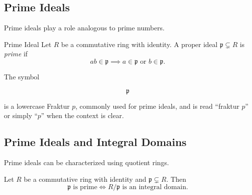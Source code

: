 \subsection{Prime Ideals}
\label{subsec:prime-ideals}

Prime ideals play a role analogous to prime numbers.

\begin{definitionbox}{Prime Ideal}
Let \(R\) be a commutative ring with identity. A proper ideal
\(\mathfrak p\subsetneq R\) is \emph{prime} if
\[ ab\in\mathfrak p\implies a\in\mathfrak p\text{ or }b\in\mathfrak p. \]
\end{definitionbox}

The symbol

\[ \mathfrak p \]

is a lowercase Fraktur \(p\), commonly used for prime ideals, and is read
``fraktur \(p\)'' or simply ``\(p\)'' when the context is clear.

\subsection{Prime Ideals and Integral Domains}
\label{subsec:prime-ideal-domain}

Prime ideals can be characterized using quotient rings.

\begin{theorem}
Let \(R\) be a commutative ring with identity and
\(\mathfrak p\subsetneq R\). Then
\[ \mathfrak p\text{ is prime}
\iff
R/\mathfrak p\text{ is an integral domain}. \]
\end{theorem}


